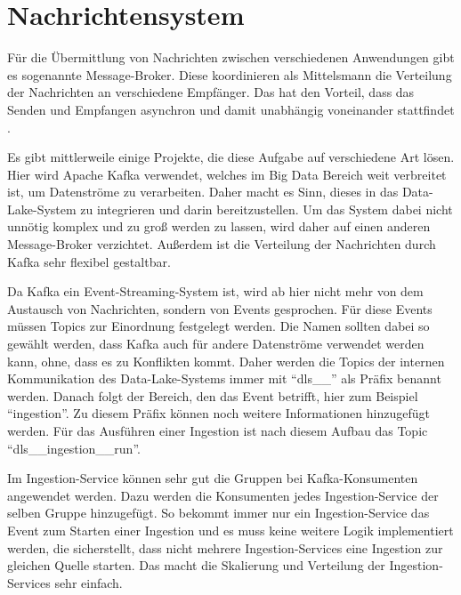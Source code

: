 \section{Nachrichtensystem}

Für die Übermittlung von Nachrichten zwischen verschiedenen Anwendungen gibt es sogenannte Message-Broker.
Diese koordinieren als Mittelsmann die Verteilung der Nachrichten an verschiedene Empfänger.
Das hat den Vorteil, dass das Senden und Empfangen asynchron und damit unabhängig voneinander stattfindet \parencite{message-broker}.

Es gibt mittlerweile einige Projekte, die diese Aufgabe auf verschiedene Art lösen.
Hier wird Apache Kafka verwendet, welches im Big Data Bereich weit verbreitet ist, um Datenströme zu verarbeiten.
Daher macht es Sinn, dieses in das Data-Lake-System zu integrieren und darin bereitzustellen.
Um das System dabei nicht unnötig komplex und zu groß werden zu lassen, wird daher auf einen anderen Message-Broker verzichtet.
Außerdem ist die Verteilung der Nachrichten durch Kafka sehr flexibel gestaltbar.

Da Kafka ein Event-Streaming-System ist, wird ab hier nicht mehr von dem Austausch von Nachrichten, sondern von Events gesprochen.
Für diese Events müssen Topics zur Einordnung festgelegt werden.
Die Namen sollten dabei so gewählt werden, dass Kafka auch für andere Datenströme verwendet werden kann, ohne, dass es zu Konflikten kommt.
Daher werden die Topics der internen Kommunikation des Data-Lake-Systems immer mit "`dls\_\_"' als Präfix benannt werden.
Danach folgt der Bereich, den das Event betrifft, hier zum Beispiel "`ingestion"'.
Zu diesem Präfix können noch weitere Informationen hinzugefügt werden.
Für das Ausführen einer Ingestion ist nach diesem Aufbau das Topic "`dls\_\_ingestion\_\_run"'.

Im Ingestion-Service können sehr gut die Gruppen bei Kafka-Konsumenten angewendet werden.
Dazu werden die Konsumenten jedes Ingestion-Service der selben Gruppe hinzugefügt.
So bekommt immer nur ein Ingestion-Service das Event zum Starten einer Ingestion und es muss keine weitere Logik implementiert werden, die sicherstellt, dass nicht mehrere Ingestion-Services eine Ingestion zur gleichen Quelle starten.
Das macht die Skalierung und Verteilung der Ingestion-Services sehr einfach.